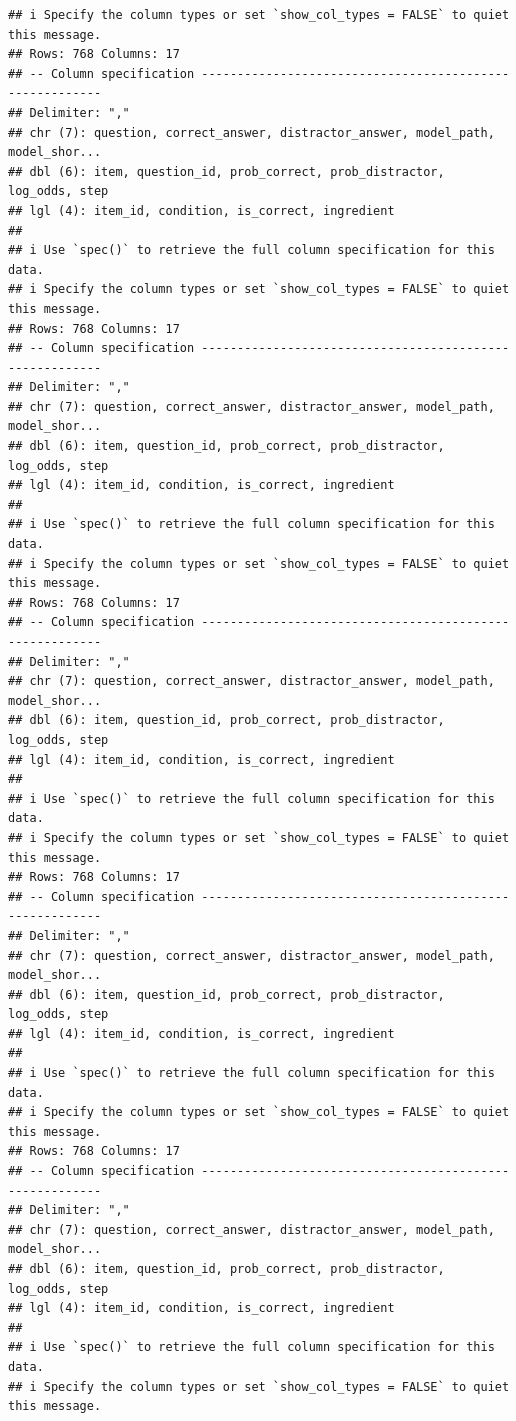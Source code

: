 \documentclass[
]{article}
\begin{document}
\begin{verbatim}
## i Specify the column types or set `show_col_types = FALSE` to quiet this message.
## Rows: 768 Columns: 17
## -- Column specification --------------------------------------------------------
## Delimiter: ","
## chr (7): question, correct_answer, distractor_answer, model_path, model_shor...
## dbl (6): item, question_id, prob_correct, prob_distractor, log_odds, step
## lgl (4): item_id, condition, is_correct, ingredient
## 
## i Use `spec()` to retrieve the full column specification for this data.
## i Specify the column types or set `show_col_types = FALSE` to quiet this message.
## Rows: 768 Columns: 17
## -- Column specification --------------------------------------------------------
## Delimiter: ","
## chr (7): question, correct_answer, distractor_answer, model_path, model_shor...
## dbl (6): item, question_id, prob_correct, prob_distractor, log_odds, step
## lgl (4): item_id, condition, is_correct, ingredient
## 
## i Use `spec()` to retrieve the full column specification for this data.
## i Specify the column types or set `show_col_types = FALSE` to quiet this message.
## Rows: 768 Columns: 17
## -- Column specification --------------------------------------------------------
## Delimiter: ","
## chr (7): question, correct_answer, distractor_answer, model_path, model_shor...
## dbl (6): item, question_id, prob_correct, prob_distractor, log_odds, step
## lgl (4): item_id, condition, is_correct, ingredient
## 
## i Use `spec()` to retrieve the full column specification for this data.
## i Specify the column types or set `show_col_types = FALSE` to quiet this message.
## Rows: 768 Columns: 17
## -- Column specification --------------------------------------------------------
## Delimiter: ","
## chr (7): question, correct_answer, distractor_answer, model_path, model_shor...
## dbl (6): item, question_id, prob_correct, prob_distractor, log_odds, step
## lgl (4): item_id, condition, is_correct, ingredient
## 
## i Use `spec()` to retrieve the full column specification for this data.
## i Specify the column types or set `show_col_types = FALSE` to quiet this message.
## Rows: 768 Columns: 17
## -- Column specification --------------------------------------------------------
## Delimiter: ","
## chr (7): question, correct_answer, distractor_answer, model_path, model_shor...
## dbl (6): item, question_id, prob_correct, prob_distractor, log_odds, step
## lgl (4): item_id, condition, is_correct, ingredient
## 
## i Use `spec()` to retrieve the full column specification for this data.
## i Specify the column types or set `show_col_types = FALSE` to quiet this message.

\end{verbatim}
\end{document}
